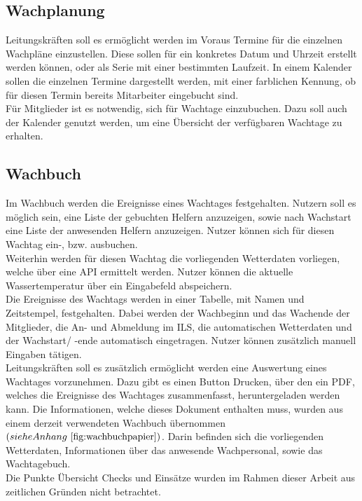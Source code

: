 \documentclass[fontsize=12pt,openright,oneside,paper=a4,BCOR=1cm]{scrbook}
\begin{document}
\subsection{Wachplanung}
Leitungskräften soll es ermöglicht werden im Voraus Termine für die einzelnen Wachpläne einzustellen. Diese sollen für ein konkretes Datum und Uhrzeit erstellt werden können, oder als Serie mit einer bestimmten Laufzeit. In einem Kalender sollen die einzelnen Termine dargestellt werden, mit einer farblichen Kennung, ob für diesen Termin bereits Mitarbeiter eingebucht sind. \\
Für Mitglieder ist es notwendig, sich für Wachtage einzubuchen. Dazu soll auch der Kalender genutzt werden, um eine Übersicht der verfügbaren Wachtage zu erhalten.

\subsection{Wachbuch}
Im Wachbuch werden die Ereignisse eines Wachtages festgehalten. Nutzern soll es möglich sein, eine Liste der gebuchten Helfern anzuzeigen, sowie nach Wachstart eine Liste der anwesenden Helfern anzuzeigen. Nutzer können sich für diesen Wachtag ein-, bzw. ausbuchen. \\
Weiterhin werden für diesen Wachtag die vorliegenden Wetterdaten vorliegen, welche über eine API ermittelt werden. Nutzer können die aktuelle Wassertemperatur über ein Eingabefeld abspeichern. \\
Die Ereignisse des Wachtags werden in einer Tabelle, mit Namen und Zeitstempel, festgehalten. Dabei werden der Wachbeginn und das Wachende der Mitglieder, die An- und Abmeldung im ILS, die automatischen Wetterdaten und der Wachstart/ -ende automatisch eingetragen. Nutzer können zusätzlich manuell Eingaben tätigen. \\
Leitungskräften soll es zusätzlich ermöglicht werden eine Auswertung eines Wachtages vorzunehmen. Dazu gibt es einen Button \glqq Drucken\grqq{}, über den ein PDF, welches die Ereignisse des Wachtages zusammenfasst, heruntergeladen werden kann. Die Informationen, welche dieses Dokument enthalten muss, wurden aus einem derzeit verwendeten Wachbuch übernommen $(siehe Anhang ~\ref{fig:wachbuchpapier})$. Darin befinden sich die vorliegenden Wetterdaten, Informationen über das anwesende Wachpersonal, sowie das Wachtagebuch. \\
Die Punkte \glqq Übersicht Checks\grqq{} und \glqq Einsätze\grqq{} wurden im Rahmen dieser Arbeit aus zeitlichen Gründen nicht betrachtet. 
\end{document}
